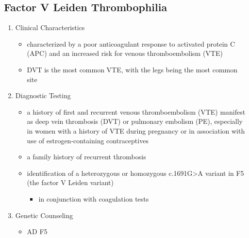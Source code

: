 \documentclass[12pt]{scrartcl}
\begin{document}
\subsection{Factor V Leiden Thrombophilia}
\label{sec:orge1e89d3}
\begin{enumerate}
\item Clinical Characteristics
\label{sec:org76f486b}
\begin{itemize}
\item characterized by a poor anticoagulant response to activated protein
C (APC) and an increased risk for venous thromboembolism (VTE)
\item DVT is the most common VTE, with the legs being the most common
site
\end{itemize}
\item Diagnostic Testing
\label{sec:orgb92ba04}
\begin{itemize}
\item a history of first and recurrent venous thromboembolism (VTE)
manifest as deep vein thrombosis (DVT) or pulmonary embolism (PE),
especially in women with a history of VTE during pregnancy or in
association with use of estrogen-containing contraceptives
\item a family history of recurrent thrombosis

\item identification of a heterozygous or homozygous c.1691G>A variant in F5
(the factor V Leiden variant)
\begin{itemize}
\item in conjunction with coagulation tests
\end{itemize}
\end{itemize}
\item Genetic Counseling
\label{sec:org4ff6b1f}
\begin{itemize}
\item AD F5
\end{itemize}
\end{enumerate}
\end{document}
